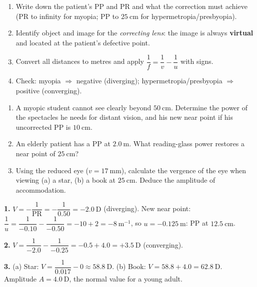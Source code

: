 \documentclass[11pt]{article}
\begin{document}
\begin{methode}
\begin{enumerate}
\item Write down the patient's PP and PR and what the correction must achieve (PR to infinity for myopia; PP to $25\ \mathrm{cm}$ for hypermetropia/presbyopia).
\item Identify object and image for the \emph{correcting lens}: the image is always \textbf{virtual} and located at the patient's defective point.
\item Convert all distances to metres and apply $\dfrac{1}{f} = \dfrac{1}{v} - \dfrac{1}{u}$ with signs.
\item Check: myopia $\Rightarrow$ negative (diverging); hypermetropia/presbyopia $\Rightarrow$ positive (converging).
\end{enumerate}
\end{methode}

\begin{exercice}[Practice]
\begin{enumerate}
\item A myopic student cannot see clearly beyond $50\ \mathrm{cm}$. Determine the power of the spectacles he needs for distant vision, and his new near point if his uncorrected PP is $10\ \mathrm{cm}$.
\item An elderly patient has a PP at $2.0\ \mathrm{m}$. What reading-glass power restores a near point of $25\ \mathrm{cm}$?
\item Using the reduced eye ($v = 17\ \mathrm{mm}$), calculate the vergence of the eye when viewing (a) a star, (b) a book at $25\ \mathrm{cm}$. Deduce the amplitude of accommodation.
\end{enumerate}
\end{exercice}

\begin{corrige}[Exercise 1]
\textbf{1.} $V = -\dfrac{1}{\mathrm{PR}} = -\dfrac{1}{0.50} = -2.0\ \mathrm{D}$ (diverging). New near point: $\dfrac{1}{u} = \dfrac{1}{-0.10} - \dfrac{1}{-0.50} = -10 + 2 = -8\ \mathrm{m^{-1}}$, so $u = -0.125\ \mathrm{m}$: PP at $12.5\ \mathrm{cm}$.

\textbf{2.} $V = \dfrac{1}{-2.0} - \dfrac{1}{-0.25} = -0.5 + 4.0 = +3.5\ \mathrm{D}$ (converging).

\textbf{3.} (a) Star: $V = \dfrac{1}{0.017} - 0 \approx 58.8\ \mathrm{D}$. (b) Book: $V = 58.8 + 4.0 = 62.8\ \mathrm{D}$. Amplitude $A = 4.0\ \mathrm{D}$, the normal value for a young adult.
\end{corrige}
\end{document}
